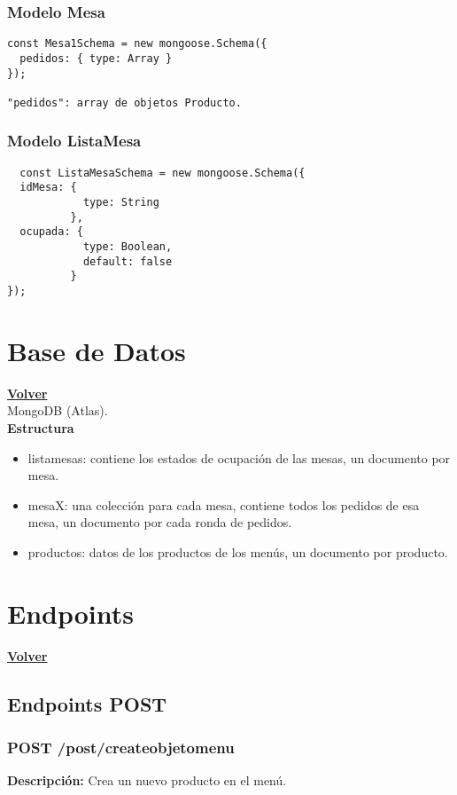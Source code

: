 \documentclass[12pt]{article}
\begin{document}
\subsubsection{Modelo Mesa}
\begin{verbatim}
const Mesa1Schema = new mongoose.Schema({
  pedidos: { type: Array }
});

"pedidos": array de objetos Producto.
\end{verbatim}


\subsubsection{Modelo ListaMesa}
\begin{verbatim}
  const ListaMesaSchema = new mongoose.Schema({
  idMesa: {
            type: String
          },
  ocupada: {
            type: Boolean,
            default: false
          }
});
\end{verbatim}
\clearpage

\section{Base de Datos}
\hyperlink{anchor-indice}{\textbf{Volver}}\\

MongoDB (Atlas).\\

{\textbf{Estructura}}
\begin{itemize}
  \item listamesas: contiene los estados de ocupación de las mesas, un documento por mesa.
  \item mesaX: una colección para cada mesa, contiene todos los pedidos de esa mesa, un documento por cada ronda de pedidos.
  \item productos: datos de los productos de los menús, un documento por producto.
\end{itemize}
\clearpage

\section{Endpoints}
\hyperlink{anchor-indice}{\textbf{Volver}}\\

\subsection{Endpoints POST}

\subsubsection{POST /post/createobjetomenu}
\textbf{Descripción:} Crea un nuevo producto en el menú.\\
\end{document}
